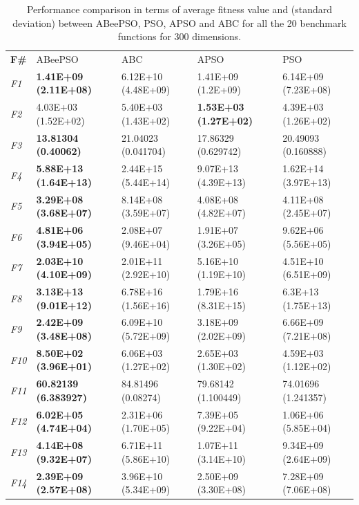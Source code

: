 \begin{table}[!h]
\caption{\small{Performance comparison in terms of average fitness value and (standard deviation) between ABeePSO, PSO, APSO and ABC for all the 20 benchmark functions for 300 dimensions.}}
\label{tab:Comparison_300D}
\begin{center}
\begin{tabular}{p{0.5cm}|p{2.5cm}|p{2.5cm}|p{2.5cm}|p{2.5cm}}
\hline\noalign{\smallskip}
\textbf{F\#}	& ABeePSO & ABC & APSO & PSO    \\		
\noalign{\smallskip}
\hline
\noalign{\smallskip}
\textit{F1}	& \textbf{1.41E+09 (2.11E+08)} & 6.12E+10 (4.48E+09) & 1.41E+09 (1.2E+09) & 6.14E+09 (7.23E+08) \\
\textit{F2}	& 4.03E+03 (1.52E+02) & 5.40E+03 (1.43E+02) & \textbf{1.53E+03 (1.27E+02)} & 4.39E+03 (1.26E+02)\\		
\textit{F3}	& \textbf{13.81304 (0.40062)} & 21.04023 (0.041704) & 17.86329 (0.629742) & 20.49093 (0.160888) \\
\textit{F4}& \textbf{5.88E+13 (1.64E+13)} & 2.44E+15 (5.44E+14) & 9.07E+13 (4.39E+13) & 1.62E+14 (3.97E+13) \\
\textit{F5}& \textbf{3.29E+08 (3.68E+07)} & 8.14E+08 (3.59E+07) & 4.08E+08 (4.82E+07) & 4.11E+08 (2.45E+07) \\
\textit{F6}& \textbf{4.81E+06 (3.94E+05)} & 2.08E+07 (9.46E+04) & 1.91E+07 (3.26E+05) & 9.62E+06 (5.56E+05) \\
\textit{F7}& \textbf{2.03E+10 (4.10E+09)} & 2.01E+11 (2.92E+10) & 5.16E+10 (1.19E+10) & 4.51E+10 (6.51E+09) \\
\textit{F8}& \textbf{3.13E+13 (9.01E+12)} & 6.78E+16 (1.56E+16) & 1.79E+16 (8.31E+15) & 6.3E+13 (1.75E+13) \\
\textit{F9}& \textbf{2.42E+09 (3.48E+08)} & 6.09E+10 (5.72E+09) & 3.18E+09 (2.02E+09) & 6.66E+09 (7.21E+08) \\
\textit{F10}& \textbf{8.50E+02 (3.96E+01)} & 6.06E+03 (1.27E+02) & 2.65E+03 (1.30E+02) & 4.59E+03 (1.12E+02)\\
\textit{F11}& \textbf{60.82139 (6.383927)} & 84.81496 (0.08274) & 79.68142 (1.100449) & 74.01696 (1.241357) \\
\textit{F12}& \textbf{6.02E+05 (4.74E+04)} & 2.31E+06 (1.70E+05) & 7.39E+05 (9.22E+04) & 1.06E+06 (5.85E+04)\\
\textit{F13}& \textbf{4.14E+08 (9.32E+07)} & 6.71E+11 (5.86E+10) & 1.07E+11 (3.14E+10) & 9.34E+09 (2.64E+09)\\
\textit{F14}& \textbf{2.39E+09 (2.57E+08)} & 3.96E+10 (5.34E+09) & 2.50E+09 (3.30E+08) & 7.28E+09 (7.06E+08)\\

\end{tabular}
\end{center}
\end{table}
